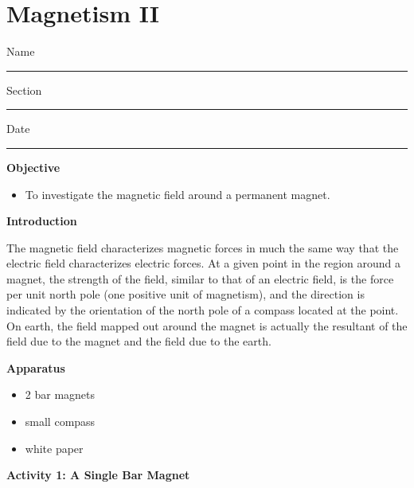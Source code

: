
\section{Magnetism II}

Name \rule{2.0in}{0.1pt}\hfill{}Section \rule{1.0in}{0.1pt}\hfill{}Date
\rule{1.0in}{0.1pt}

\textbf{Objective}

\begin{itemize}
\item To investigate the magnetic field around a permanent magnet.
\end{itemize}
\textbf{Introduction} 

The magnetic field characterizes magnetic forces in much the same way
that the electric field characterizes electric forces.
At a given point in the region around a magnet,
the strength of the field, similar to that of an electric field, is
the force per unit north pole (one positive unit of magnetism), and
the direction is indicated by the orientation of the north pole of
a compass located at the point. On earth, the field mapped out around
the magnet is actually the resultant of the field due to the magnet
and the field due to the earth.

\textbf{Apparatus}

\begin{itemize}
\item 2 bar magnets 
\item small compass 
\item white paper
\end{itemize}
\textbf{Activity 1: A Single Bar Magnet}

\vspace{0.3cm}
{\centering {} \par}
\vspace{0.3cm}

